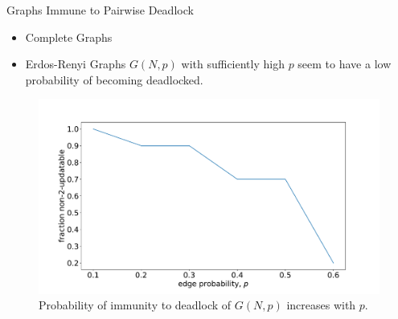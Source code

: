 \documentclass[usenames,dvipsnames,10pt]{beamer}
\theoremstyle{remark}
\begin{document}

\begin{frame}{Graphs Immune to Pairwise Deadlock}
\begin{itemize}
    \item Complete Graphs
    \item Erdos-Renyi Graphs $G(N,p)$ with sufficiently high $p$ seem to have a low probability of becoming deadlocked.
\end{itemize}
\begin{figure}[!htb]
    \centering
    \includegraphics[scale=.2]{../Figures/compare_ER_7_nodes_0_1-0_9_10_trials.pdf}
    \caption{Probability of immunity to deadlock of $G(N,p)$ increases with $p$.}
    \label{fig:erdosRenyiDeadlocked}
\end{figure}
\end{frame}
\end{document}

